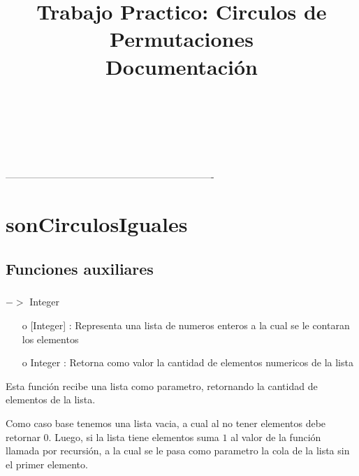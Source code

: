 \documentclass[10pt,journal]{IEEEtran}
\title{\bfseries \huge {Trabajo Practico: Circulos de Permutaciones \\ Documentación} }
\author{
	\IEEEauthorblockN{Bonino Bianca} 
\\
\and
	\IEEEauthorblockN{Contreras Santiago} 
\\
\and
	\IEEEauthorblockN{Remus Ezequiel} 
}
\begin{document}
\maketitle
\newpage
\tableofcontents
\pagestyle{fancy}
----------------------------------------------------------------
\newpage
\section{sonCirculosIguales}
\subsection{Funciones auxiliares}
\subsubsection{\color{Red}{longitud}}
\begin{description}[style=nextline]
        \item[\color{Green}{Signatura}] [Integer] $->$ Integer 
        \begin{itemize}
        
        \item [o] [Integer] : Representa una lista de numeros enteros a la cual se le contaran los elementos
        
        \item [o] Integer : Retorna como valor la cantidad de elementos numericos de la lista
        \end{itemize}        
        
        \item[\color{Green}{Descripción}] Esta función recibe una lista como parametro, retornando la cantidad de elementos de la lista. 
        
        Como caso base tenemos una lista vacia, a cual al no tener elementos debe retornar $0$. Luego, si la lista tiene elementos suma $1$ al valor de la función llamada por recursión, a la cual se le pasa como parametro la cola de la lista sin el primer elemento.  
\end{description}
\end{document}

